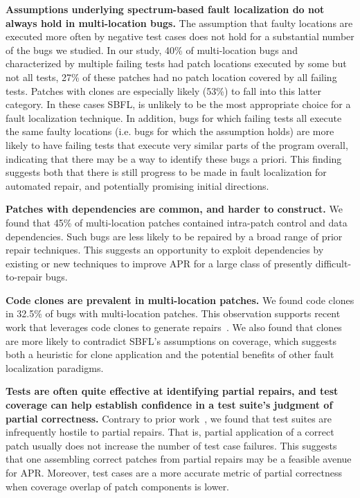 \documentclass[10pt, conference]{IEEEtran}
\begin{document}
\vspace{1ex}
\noindent\textbf{Assumptions underlying spectrum-based fault
  localization do not always hold in multi-location bugs.}
The assumption that faulty locations
are executed more often by negative test cases does not hold for a substantial
number of the bugs we studied. In our study, 40\% of multi-location bugs
and characterized by multiple failing tests had patch
locations executed by some but not all tests,  27\% of
these patches had no patch location covered by all failing
tests.
Patches with clones are especially likely (53\%) to fall into this latter category.
In these cases SBFL, is unlikely to be the most 
appropriate choice for a
fault localization technique. 
%
In addition, bugs for which failing tests all execute the same faulty locations (i.e. bugs for 
which the assumption holds) are more likely to have failing tests that execute very similar 
parts of the program overall, indicating that there may be a way to identify these bugs a priori.
This finding suggests both that there is still progress
to be made in fault localization for automated repair, and potentially promising initial directions.

\vspace{1ex}
\noindent\textbf{Patches with dependencies are common, and harder to construct.}
We found that 45\% of multi-location patches contained
intra-patch control and data dependencies. Such bugs are less likely to be
repaired by a broad range of prior repair techniques. 
This suggests an opportunity to exploit dependencies by
existing or new techniques to improve APR for a large class of presently difficult-to-repair
bugs.

\vspace{1ex}
\noindent\textbf{Code clones are prevalent in multi-location patches.}
We found code clones in 32.5\% of bugs with multi-location
patches. This observation supports recent work that leverages code clones to
generate repairs~\cite{saha2019harnessing}.
We also found that clones are more likely to contradict SBFL's assumptions 
on coverage, which suggests both a heuristic for clone application and the
potential benefits of other fault localization paradigms.

\vspace{1ex}
\noindent\textbf{Tests are
    often quite effective at identifying partial repairs, and test coverage can
    help establish confidence in a test suite's judgment of partial correctness.}
Contrary to prior work~\cite{gecco09}, we found that test suites are infrequently
hostile to partial repairs. That is, partial application of a correct patch
usually does not increase the number of test case failures. This suggests that
one assembling correct patches from partial repairs may be a feasible avenue for
APR.  
Moreover, test cases are a more accurate metric of partial correctness when coverage
overlap of patch components is lower.
\end{document}
